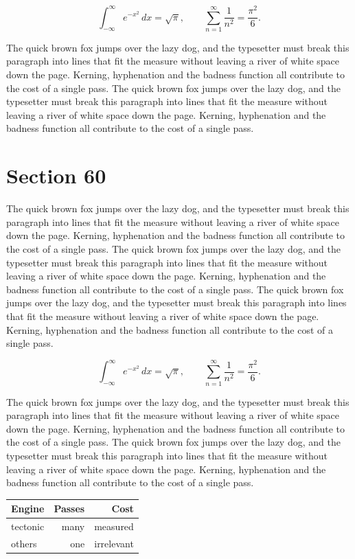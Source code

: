 \documentclass{article}
\begin{document}
\begin{equation}
\int_{-\infty}^{\infty} e^{-x^{2}}\,dx = \sqrt{\pi}, \qquad
\sum_{n=1}^{\infty} \frac{1}{n^{2}} = \frac{\pi^{2}}{6}.
\end{equation}

The quick brown fox jumps over the lazy dog, and the typesetter must break this paragraph into lines that fit the measure without leaving a river of white space down the page. Kerning, hyphenation and the badness function all contribute to the cost of a single pass. The quick brown fox jumps over the lazy dog, and the typesetter must break this paragraph into lines that fit the measure without leaving a river of white space down the page. Kerning, hyphenation and the badness function all contribute to the cost of a single pass. 
\section{Section 60}
The quick brown fox jumps over the lazy dog, and the typesetter must break this paragraph into lines that fit the measure without leaving a river of white space down the page. Kerning, hyphenation and the badness function all contribute to the cost of a single pass. The quick brown fox jumps over the lazy dog, and the typesetter must break this paragraph into lines that fit the measure without leaving a river of white space down the page. Kerning, hyphenation and the badness function all contribute to the cost of a single pass. The quick brown fox jumps over the lazy dog, and the typesetter must break this paragraph into lines that fit the measure without leaving a river of white space down the page. Kerning, hyphenation and the badness function all contribute to the cost of a single pass. 

\begin{equation}
\int_{-\infty}^{\infty} e^{-x^{2}}\,dx = \sqrt{\pi}, \qquad
\sum_{n=1}^{\infty} \frac{1}{n^{2}} = \frac{\pi^{2}}{6}.
\end{equation}

The quick brown fox jumps over the lazy dog, and the typesetter must break this paragraph into lines that fit the measure without leaving a river of white space down the page. Kerning, hyphenation and the badness function all contribute to the cost of a single pass. The quick brown fox jumps over the lazy dog, and the typesetter must break this paragraph into lines that fit the measure without leaving a river of white space down the page. Kerning, hyphenation and the badness function all contribute to the cost of a single pass. 

\begin{center}
\begin{tabular}{lrr}
\toprule
Engine & Passes & Cost \\
\midrule
tectonic & many & measured \\
others & one & irrelevant \\
\bottomrule
\end{tabular}
\end{center}
\end{document}
